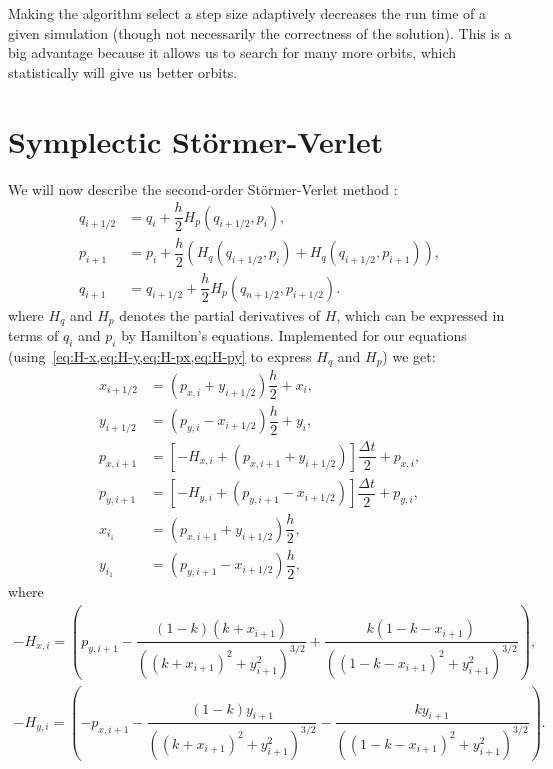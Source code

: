 Making the algorithm select a step size adaptively decreases the run time of a given simulation (though not necessarily the correctness of the solution). This is a big advantage because it allows us to search for many more orbits, which statistically will give us better orbits.

\section{Symplectic Störmer-Verlet}
We will now describe the second-order Störmer-Verlet method \cite{Hochbruck2008}:
\begin{align}
q_{i+1/2} &= q_i + \dfrac{h}{2}H_p(q_{i+1/2}, p_i), \\
p_{i+1} &= p_i + \dfrac{h}{2}(H_q(q_{i+1/2}, p_i) + H_q(q_{i+1/2}, p_{i+1})), \\
q_{i+1} &= q_{i+1/2} + \dfrac{h}{2}H_p(q_{n+1/2}, p_{i+1/2}).
\end{align}
where $H_q$ and $H_p$ denotes the partial derivatives of $H$, which can be expressed in terms of $q_i$ and $p_i$ by Hamilton's equations. Implemented for our equations (using~\cref{eq:H-x,eq:H-y,eq:H-px,eq:H-py} to express $H_q$ and $H_p$) we get:
\begin{align}
x_{i+1/2} &= (p_{x,i} + y_{i+1/2})\dfrac{h}{2} + x_i, \\[0.3cm]
y_{i+1/2} &= (p_{y,i} - x_{i+1/2})\dfrac{h}{2} + y_i, \\[0.8cm]
%
%
p_{x,i+1} &= \left[-H_{x,i} + (p_{x,i+1} + y_{i+1/2}) \right]\dfrac{\Delta t}{2} + p_{x,i}, \\[0.3cm]
%
p_{y,i+1} &= \left[-H_{y,i} + (p_{y,i+1} -x_{i+1/2}) \right]\dfrac{\Delta t}{2} + p_{y,i},\\[0.8cm]
%
%
x_{i_1} &= (p_{x,i+1} + y_{i+1/2})\dfrac{h}{2}, \\[0.3cm]
y_{i_1} &= (p_{y,i+1} - x_{i+1/2})\dfrac{h}{2},
\end{align}
where
\begin{align}
-H_{x,i} = \left(p_{y,i+1} - \dfrac{(1-k)(k+x_{i+1})}{((k+x_{i+1})^2+y_{i+1}^2)^{3/2}} + \dfrac{k(1-k-x_{i+1})}{((1-k-x_{i+1})^2+y_{i+1}^2)^{3/2}}\right), \\[0.5cm]
-H_{y,i} = \left(-p_{x,i+1} - \dfrac{(1-k)y_{i+1}}{((k+x_{i+1})^2+y_{i+1}^2)^{3/2}} - \dfrac{k y_{i+1}}{((1-k-x_{i+1})^2+y_{i+1}^2)^{3/2}}\right).
\end{align}


